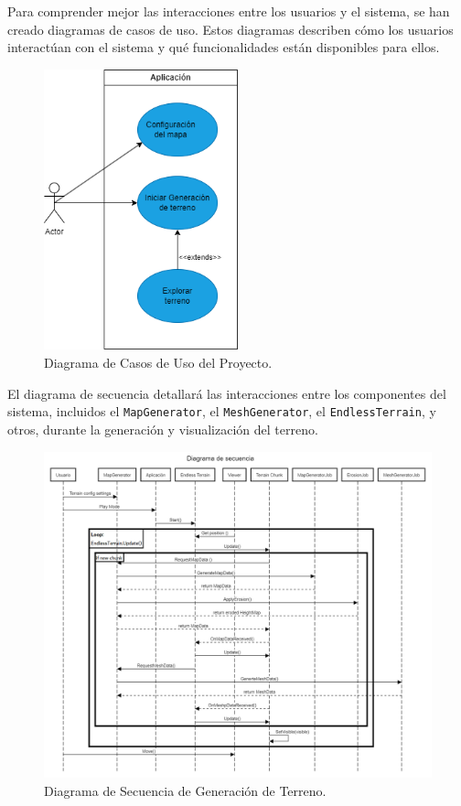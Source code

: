 Para comprender mejor las interacciones entre los usuarios y el sistema, se han creado diagramas de casos de uso. Estos diagramas describen cómo los usuarios interactúan con el sistema y qué funcionalidades están disponibles para ellos.

\begin{figure}[H]
    \centering
    \includegraphics[width=0.5\textwidth]{img/UseCases.png}
    \caption{Diagrama de Casos de Uso del Proyecto.}
\end{figure}


El diagrama de secuencia detallará las interacciones entre los componentes del sistema, incluidos el \texttt{MapGenerator}, el \texttt{MeshGenerator}, el \texttt{EndlessTerrain}, y otros, durante la generación y visualización del terreno.

\begin{figure}[H]
    \centering
    \includegraphics[width=1\textwidth]{img/Diagrama de secuencia.png}
    \caption{Diagrama de Secuencia de Generación de Terreno.}
\end{figure}


